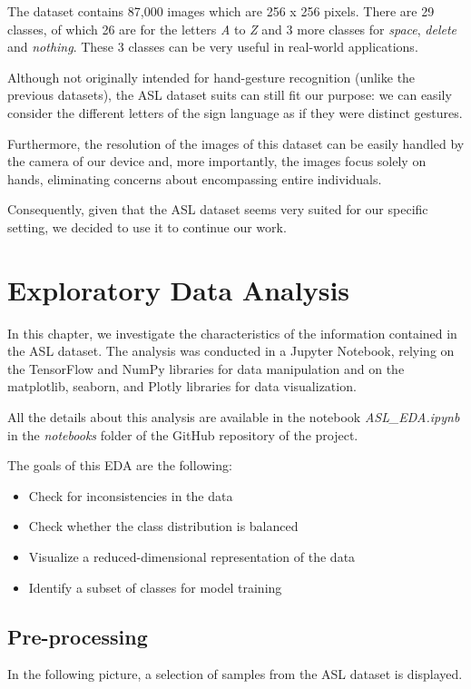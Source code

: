 \documentclass{Configuration_Files/PoliMi3i_thesis}
\begin{document}
The dataset contains 87,000 images which are 256 x 256 pixels. There are 29 classes, of which 26 are for the letters \textit{A} to \textit{Z} and 3 more classes for \textit{space}, \textit{delete} and \textit{nothing}. These 3 classes can be very useful in real-world applications.

Although not originally intended for hand-gesture recognition (unlike the previous datasets), the ASL dataset suits can still fit our purpose: we can easily consider the different letters of the sign language as if they were distinct gestures.

Furthermore, the resolution of the images of this dataset can be easily handled by the camera of our device and, more importantly, the images focus solely on hands, eliminating concerns about encompassing entire individuals.

Consequently, given that the ASL dataset seems very suited for our specific setting, we decided to use it to continue our work.


\chapter{Exploratory Data Analysis}
\label{ch:eda}%
In this chapter, we investigate the characteristics of the information contained in the ASL dataset. The analysis was conducted in a Jupyter Notebook, relying on the TensorFlow and NumPy libraries for data manipulation and on the matplotlib, seaborn, and Plotly libraries for data visualization.

All the details about this analysis are available in the notebook \textit{ASL\_EDA.ipynb} in the \textit{notebooks} folder of the GitHub repository \cite{project-repository} of the project. 

The goals of this EDA are the following:
\begin{itemize}
    \item Check for inconsistencies in the data
    \item Check whether the class distribution is balanced
    \item Visualize a reduced-dimensional representation of the data
    \item Identify a subset of classes for model training
\end{itemize}

\section{Pre-processing}
\label{sec:preprocessing}
In the following picture, a selection of samples from the ASL dataset is displayed.
\end{document}
